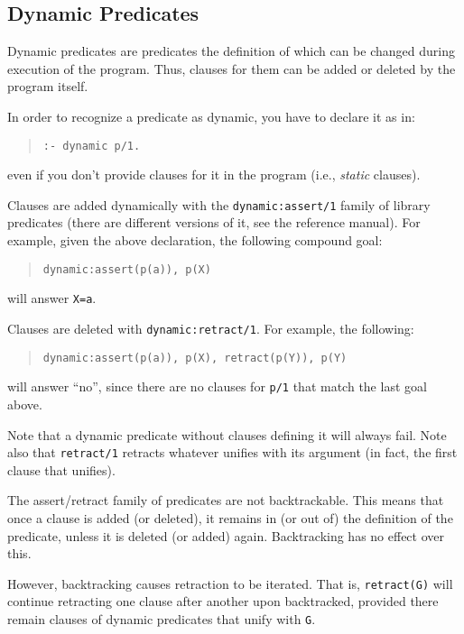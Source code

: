 \subsection{Dynamic Predicates}
\label{sec:dynamic}

Dynamic predicates are predicates the definition of which can be
changed during execution of the program. Thus, clauses for them can be
added or deleted by the program itself.

In order to recognize a predicate as dynamic, you have to declare it
as in:
\begin{quote}
\begin{verbatim}
:- dynamic p/1.
\end{verbatim}
\end{quote}
%
even if you don't provide clauses for it in the program (i.e., {\em
  static} clauses).

Clauses are added dynamically with the \verb+dynamic:assert/1+ family
of library predicates (there are different versions of it, see the
reference manual). For example, given the above declaration, the following
compound goal:
\begin{quote}
\begin{verbatim}
dynamic:assert(p(a)), p(X)
\end{verbatim}
\end{quote}
%
will answer \verb+X=a+.

Clauses are deleted with \verb+dynamic:retract/1+. For example, the
following: 
\begin{quote}
\begin{verbatim}
dynamic:assert(p(a)), p(X), retract(p(Y)), p(Y)
\end{verbatim}
\end{quote}
%
will answer ``no'', since there are no clauses for \verb+p/1+ that
match the last goal above.

Note that a dynamic predicate without clauses defining it will always
fail. Note also that \verb+retract/1+ retracts whatever unifies with
its argument (in fact, the first clause that unifies).

The assert/retract family of predicates are not backtrackable. This
means that once a clause is added (or deleted), it remains in (or out
of) the definition of the predicate, unless it is deleted (or added)
again. Backtracking has no effect over this.

However, backtracking causes retraction to be iterated. That is,
\verb+retract(G)+ will continue retracting one clause after another
upon backtracked, provided there remain clauses of dynamic predicates
that unify with \verb+G+.

